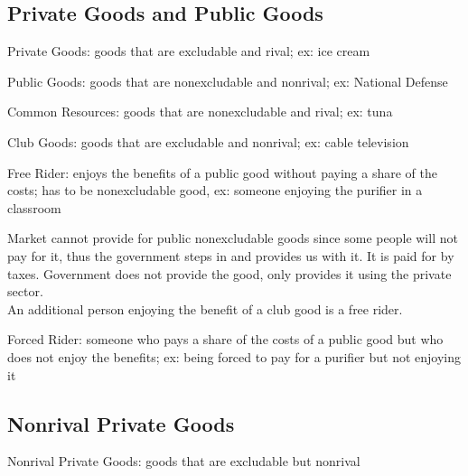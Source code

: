 \documentclass[12pt]{article}
\begin{document}
\subsection{Private Goods and Public Goods}
\begin{definition} Private Goods: goods that are excludable and rival; ex: ice cream \end{definition}
\begin{definition} Public Goods: goods that are nonexcludable and nonrival; ex: National Defense \end{definition}
\begin{definition} Common Resources: goods that are nonexcludable and rival; ex: tuna \end{definition} 
\begin{definition} Club Goods: goods that are excludable and nonrival; ex: cable television \end{definition} 
\begin{definition} Free Rider: enjoys the benefits of a public good without paying a share of the costs; has to be nonexcludable good, ex: someone enjoying the purifier in a classroom \end{definition}
Market cannot provide for public nonexcludable goods since some people will not pay for it, thus the government steps in and provides us with it. It is paid for by taxes. Government does not provide the good, only provides it using the private sector. \\
An additional person enjoying the benefit of a club good is a free rider. 
\begin{definition} Forced Rider: someone who pays a share of the costs of a public good but who does not enjoy the benefits; ex: being forced to pay for a purifier but not enjoying it \end{definition}


\subsection{Nonrival Private Goods}
\begin{definition} Nonrival Private Goods: goods that are excludable but nonrival \end{definition}
\end{document}

